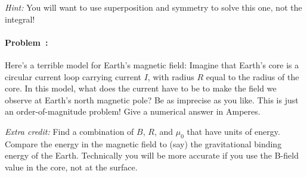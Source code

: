 \documentclass[12pt]{article}
\begin{document}
\textit{Hint:} You will want to use superposition and symmetry to
solve this one, not the integral!

\paragraph{Problem~\theproblem:}%
Here's a terrible model for Earth's magnetic field: Imagine that
Earth's core is a circular current loop carrying current $I$, with
radius $R$ equal to the radius of the core. In this model, what does
the current have to be to make the field we observe at Earth's
north magnetic pole? Be as imprecise as you like. This is just an
order-of-magnitude problem! Give a numerical answer in Amperes.

\textit{Extra credit:} Find a combination of $B$, $R$, and $\mu_0$
that have units of energy. Compare the energy in the magnetic field
to (say) the gravitational binding energy of the Earth. Technically
you will be more accurate if you use the B-field value in the core,
not at the surface.
\end{document}
